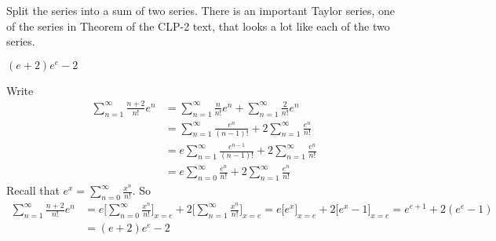 \begin{hint}
Split the series into a sum of two series.
There is an important Taylor series, one of the series in
Theorem  of the
CLP-2 text, that looks a lot like each of the two series.
\end{hint}

\begin{answer}
$(e+2)e^e-2$
\end{answer}

\begin{solution}
Write
\begin{align*}
\sum_{n=1}^\infty\frac{n+2}{n!}e^n
&=\sum_{n=1}^\infty\frac{n}{n!}e^n
   + \sum_{n=1}^\infty\frac{2}{n!}e^n \\
&=\sum_{n=1}^\infty\frac{e^n}{(n-1)!}
   + 2\sum_{n=1}^\infty\frac{e^n}{n!}\\
&=e\sum_{n=1}^\infty\frac{e^{n-1}}{(n-1)!}
   + 2\sum_{n=1}^\infty\frac{e^n}{n!} \\
&=e\sum_{n=0}^\infty\frac{e^n}{n!}
   + 2\sum_{n=1}^\infty\frac{e^n}{n!}
\end{align*}
Recall that $e^x = \displaystyle\sum\limits_{n=0}^\infty\frac{x^n}{n!}$. So
\begin{align*}
\sum_{n=1}^\infty\frac{n+2}{n!}e^n
&=e\Big[\sum_{n=0}^\infty\frac{x^n}{n!}\Big]_{x=e}
+2\Big[\sum_{n=1}^\infty\frac{x^n}{n!}\Big]_{x=e}
=e\Big[e^x\Big]_{x=e} + 2\Big[e^x-1\Big]_{x=e}
= e^{e+1}  + 2(e^e-1) \\
&=(e+2)e^e-2
\end{align*}

\end{solution}

